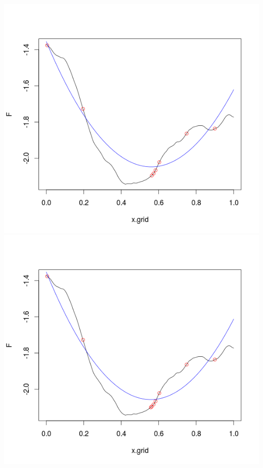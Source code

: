\begin{frame}
\includegraphics[trim = 10mm 20mm 10mm 10mm, clip, width=.3\paperwidth]{fig/prs5.png}
\\
\includegraphics[trim = 10mm 20mm 10mm 10mm, clip, width=.3\paperwidth]{fig/prs6.png}

\end{frame}
